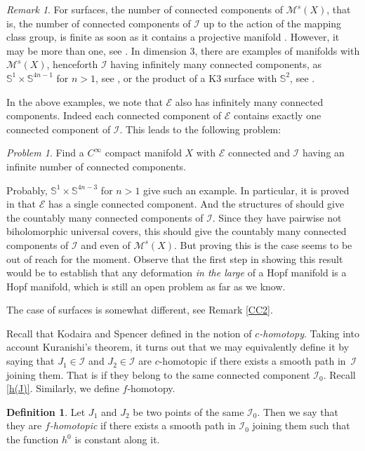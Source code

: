 \documentclass[10pt]{amsart}
\let\mathcal\mathscr
\theoremstyle{plain}
\theoremstyle{definition}
\newtheorem{definition}[theorem]{Definition}
\theoremstyle{remark}
\newtheorem{remark}[theorem]{Remark}
\newtheorem{problem}[theorem]{Problem}
\numberwithin{equation}{section}
\newcommand{\cI}{\mathcal{I}}
\begin{document}
\begin{remark}
\label{countableexamples}
For surfaces, the number of connected components of $\mathcal M^s(X)$, that is, the number of connected components of $\cI$ up to the action of the mapping class group, is finite as soon as it contains a projective manifold \cite{FM}. However, it may be more than one, see \cite{Cat2}.
In dimension $3$, there are examples of manifolds with $\mathcal M^s(X)$, henceforth $\cI$ having infinitely many connected components, as $\mathbb S^1\times\mathbb S^{4n-1}$ for $n>1$, see \cite{Morita}, or the product of a K3 surface with $\mathbb S^2$, see \cite{LeBrun}.

In the above examples, we note that $\mathcal E$ also has infinitely many connected components. Indeed each connected component of $\mathcal E$ contains exactly one connected component of $\cI$. This leads to the following problem:
\begin{problem}
\label{ccpb}
Find a $C^\infty$ compact manifold $X$ with $\mathcal E$ connected and $\cI$ having an infinite number of connected components.
\end{problem}

Probably, $\mathbb S^1\times\mathbb S^{4n-3}$ for $n>1$ give such an example. In particular, it is proved in \cite{Morita} that $\mathcal E$ has a single connected component. And the structures of \cite{BVdV} should give the countably many connected components of $\cI$. Since they have pairwise not biholomorphic universal covers, this should give the countably many connected components of $\cI$ and even of $\mathcal M^s(X)$. But proving this is the case seems to be out of reach for the moment. Observe that the first step in showing this result would be to establish that any deformation \emph{in the large} of a Hopf manifold is a Hopf manifold, which is still an open problem as far as we know.

The case of surfaces is somewhat different, see Remark \ref{CC2}.
\end{remark}

Recall that Kodaira and Spencer defined in \cite{K-S1} the notion of \emph{$c$-homotopy}. Taking into account Kuranishi's theorem, it turns out that we may equivalently define it by saying that $J_1\in\cI$ and $J_2\in\cI$ are $c$-homotopic if there exists a smooth path in~$\cI$ joining them. That is if they belong to the same connected component $\cI_0$. Recall \eqref{h(J)}. Similarly, we define $f$-homotopy.

\begin{definition}
Let $J_1$ and $J_2$ be two points of the same $\cI_0$. Then we say that they are \emph{$f$-homotopic} if there exists a smooth path in $\cI_0$ joining them such that the function $h^0$ is constant along it.
\end{definition}
\end{document}
